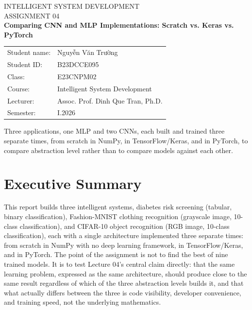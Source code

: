 \documentclass[11pt]{article}
\begin{document}
\begin{titlepage}
\centering
\vspace*{2cm}
{\Large INTELLIGENT SYSTEM DEVELOPMENT}\\[0.3cm]
{\Large ASSIGNMENT 04}\\[0.5cm]
{\huge \bfseries Comparing CNN and MLP Implementations: Scratch vs. Keras vs. PyTorch}\\[2cm]

\begin{tabular}{ll}
Student name: & Nguyễn Văn Trường \\[0.5cm]
Student ID: & B23DCCE095 \\[0.5cm]
Class: & E23CNPM02 \\[0.5cm]
Course: & Intelligent System Development \\[0.5cm]
Lecturer: & Assoc. Prof. Dinh Que Tran, Ph.D. \\[0.5cm]
Semester: & I.2026 \\
\end{tabular}

\vfill
{\large Three applications, one MLP and two CNNs, each built and trained three
separate times, from scratch in NumPy, in TensorFlow/Keras, and in PyTorch, to
compare abstraction level rather than to compare models against each other.}
\end{titlepage}

\tableofcontents
\newpage

\section{Executive Summary}

This report builds three intelligent systems, diabetes risk screening (tabular,
binary classification), Fashion-MNIST clothing recognition (grayscale image,
10-class classification), and CIFAR-10 object recognition (RGB image, 10-class
classification), each with a single architecture implemented three separate
times: from scratch in NumPy with no deep learning framework, in
TensorFlow/Keras, and in PyTorch. The point of the assignment is not to find
the best of nine trained models. It is to test Lecture 04's central claim
directly: that the same learning problem, expressed as the same architecture,
should produce close to the same result regardless of which of the three
abstraction levels builds it, and that what actually differs between the three
is code visibility, developer convenience, and training speed, not the
underlying mathematics.
\end{document}
